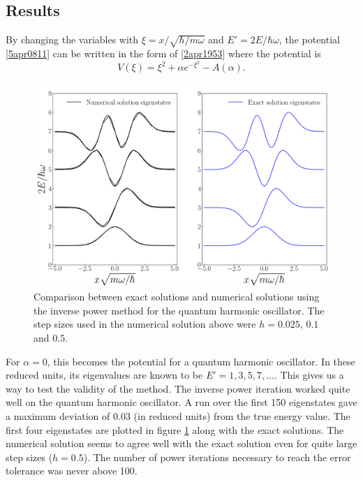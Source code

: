 \documentclass[twocolumn]{article}
\begin{document}
\begin{large}
\subsection*{Results}
By changing the variables with $\xi = x/\sqrt{\hbar/m\omega}$ and $E' = 2E/\hbar\omega$, the potential \eqref{5apr0811} can be written in the form of \eqref{2apr1953} where the potential is  
\begin{equation}
    \label{29mar1748}
    V(\xi) = \xi^2+\alpha e^{-\xi^2} - A(\alpha).
\end{equation}
\begin{figure}[b!]
    \centering
    \includegraphics[scale=0.28]{comparison.png}
    \caption{Comparison between exact solutions and numerical solutions using the inverse power method for the quantum harmonic oscillator. The step sizes used in the numerical solution above were $h=0.025$, $0.1$ and $0.5$.}
    \label{2apr2208}
\end{figure}
For $\alpha=0$, this becomes the potential for a quantum harmonic oscillator. In these reduced units, its eigenvalues are known to be $E'=1,3,5,7,\dots$. This gives us a way to test the validity of the method.
The inverse power iteration worked quite well on the quantum harmonic oscillator. A run over the first 150 eigenstates gave a maximum deviation of 0.03 (in reduced units) from the true energy value. The first four eigenstates are plotted in figure \ref{2apr2208} along with the exact solutions. The numerical solution seems to agree well with the exact solution even for quite large step sizes ($h=0.5$). The number of power iterations necessary to reach the error tolerance was never above 100.


\end{large}
\end{document}
